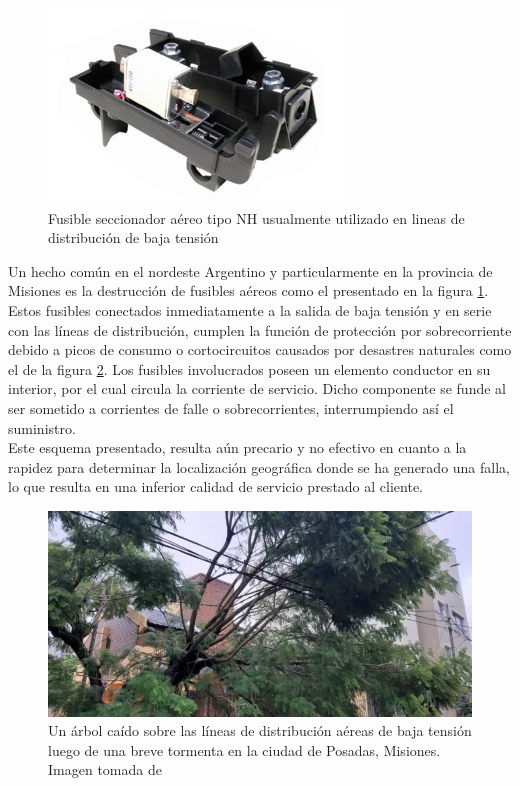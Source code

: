 \begin{figure}[h!]
	\centering
	\includegraphics[width=0.7\linewidth]{Figures/NH_aereo_bt}
	\caption{Fusible seccionador aéreo tipo NH usualmente utilizado en lineas de distribución de baja tensión}
	\label{fig:nh_aereo_bt}
\end{figure}
Un hecho común en el nordeste Argentino y particularmente en la provincia de Misiones es la destrucción de fusibles aéreos como el presentado en la figura \ref{fig:nh_aereo_bt}. Estos fusibles conectados inmediatamente a la salida de baja tensión y en serie con las líneas de distribución, cumplen la función de protección por sobrecorriente debido a picos de consumo o cortocircuitos causados por desastres naturales como el de la figura \ref{fig:arbolcaidolineabt}. Los fusibles involucrados poseen un elemento conductor en su interior, por el cual circula la corriente de servicio. Dicho componente se funde al ser sometido a corrientes de falle o sobrecorrientes, interrumpiendo así el suministro.\\
Este esquema presentado, resulta aún precario y no efectivo en cuanto a la rapidez para determinar la localización geográfica donde se ha generado una falla, lo que resulta en una inferior calidad de servicio prestado al cliente.\\
\begin{figure}[h!]
	\centering
	\includegraphics[width=0.7\linewidth]{Figures/arbol_caido_linea_bt}
	\caption{Un árbol caído sobre las líneas de distribución aéreas de baja tensión luego de una breve tormenta en la ciudad de Posadas, Misiones. Imagen tomada de \citep{Noticia_MNES}}
	\label{fig:arbolcaidolineabt}
\end{figure}

